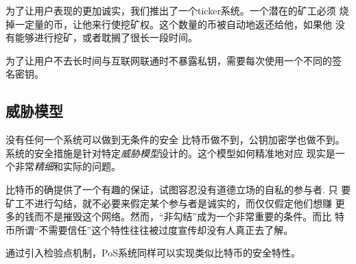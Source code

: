 \documentclass[letterpaper]{article}
\begin{document}
为了让用户表现的更加诚实，我们推出了一个ticker系统。一个潜在的矿工必须
烧掉一定量的币，让他来行使挖矿权。这个数量的币被自动地返还给他，如果他
没有能够进行挖矿，或者耽搁了很长一段时间。

为了让用户不去长时间与互联网联通时不暴露私钥，需要每次使用一个不同的签
名密钥。

\subsection{威胁模型}
没有任何一个系统可以做到无条件的安全 比特币做不到，公钥加密学也做不到。
系统的安全措施是针对特定\emph{威胁模型}设计的。这个模型如何精准地对应
现实是一个非常\emph{精细}和实际的问题。

比特币的确提供了一个有趣的保证，试图容忍没有道德立场的自私的参与者. 只
要矿工不进行勾结，就不必要来假定某个参与者是诚实的，而仅仅假定他们想赚
更多的钱而不是摧毁这个网络。然而，“非勾结”成为一个非常重要的条件。而比
特币所谓``不需要信任''这个特性往往被过度宣传却没有人真正去了解。

通过引入检验点机制，PoS系统同样可以实现类似比特币的安全特性。
\end{document}

